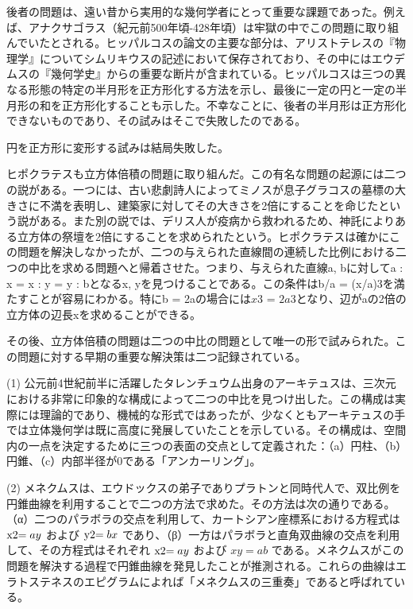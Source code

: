 \documentclass[a4paper,11pt,openany]{ltjsbook}
\begin{document}
後者の問題は、遠い昔から実用的な幾何学者にとって重要な課題であった。例えば、アナクサゴラス（紀元前500年頃-428年頃）は牢獄の中でこの問題に取り組んでいたとされる。ヒッパルコスの論文の主要な部分は、アリストテレスの『物理学』についてシムリキウスの記述において保存されており、その中にはエウデムスの『幾何学史』からの重要な断片が含まれている。ヒッパルコスは三つの異なる形態の特定の半月形を正方形化する方法を示し、最後に一定の円と一定の半月形の和を正方形化することも示した。不幸なことに、後者の半月形は正方形化できないものであり、その試みはそこで失敗したのである。

円を正方形に変形する試みは結局失敗した。

ヒポクラテスも立方体倍積の問題に取り組んだ。この有名な問題の起源には二つの説がある。一つには、古い悲劇詩人によってミノスが息子グラコスの墓標の大きさに不満を表明し、建築家に対してその大きさを2倍にすることを命じたという説がある。また別の説では、デリス人が疫病から救われるため、神託によりある立方体の祭壇を2倍にすることを求められたという。ヒポクラテスは確かにこの問題を解決しなかったが、二つの与えられた直線間の連続した比例における二つの中比を求める問題へと帰着させた。つまり、与えられた直線a, bに対してa : x = x : y = y : bとなるx, yを見つけることである。この条件はb/a = (x/a)3を満たすことが容易にわかる。特にb = 2aの場合には$x{3}$ = $2a{3}$となり、辺がaの2倍の立方体の辺長xを求めることができる。

その後、立方体倍積の問題は二つの中比の問題として唯一の形で試みられた。この問題に対する早期の重要な解決策は二つ記録されている。

(1) 公元前4世紀前半に活躍したタレンチュウム出身のアーキテュスは、三次元における非常に印象的な構成によって二つの中比を見つけ出した。この構成は実際には理論的であり、機械的な形式ではあったが、少なくともアーキテュスの手では立体幾何学は既に高度に発展していたことを示している。その構成は、空間内の一点を決定するために三つの表面の交点として定義された：（a）円柱、（b）円錐、（c）内部半径が0である「アンカーリング」。

(2) メネクムスは、エウドックスの弟子でありプラトンと同時代人で、双比例を円錐曲線を利用することで二つの方法で求めた。その方法は次の通りである。（α）二つのパラボラの交点を利用して、カートシアン座標系における方程式は \($x{2}$ = ay\) および \($y{2}$ = bx\) であり、（β）一方はパラボラと直角双曲線の交点を利用して、その方程式はそれぞれ \($x{2}$ = ay\) および \(xy = ab\) である。メネクムスがこの問題を解決する過程で円錐曲線を発見したことが推測される。これらの曲線はエラトステネスのエピグラムによれば「メネクムスの三重奏」であると呼ばれている。
\end{document}
